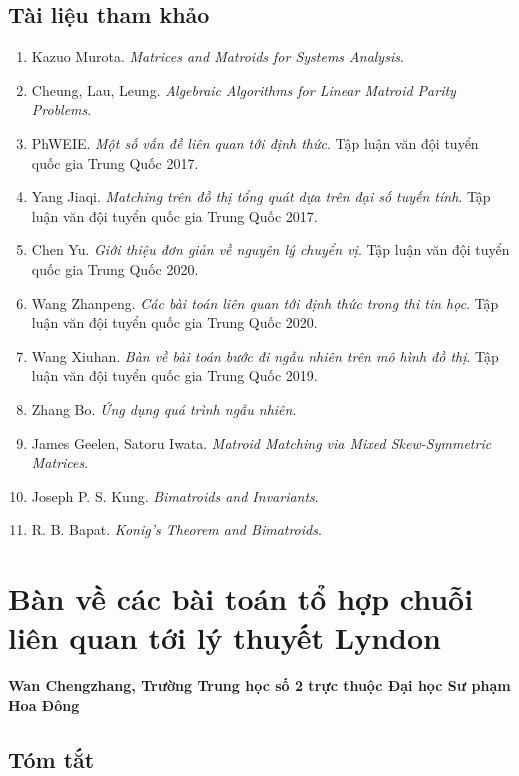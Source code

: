 \documentclass[11pt]{article}
\begin{document}
\subsection*{Tài liệu tham khảo}

\begin{enumerate}
  \item Kazuo Murota. \emph{Matrices and Matroids for Systems Analysis}.
  \item Cheung, Lau, Leung. \emph{Algebraic Algorithms for Linear Matroid
  Parity Problems}.
  \item PhWEIE. \emph{Một số vấn đề liên quan tới định thức}. Tập luận văn đội
  tuyển quốc gia Trung Quốc 2017.
  \item Yang Jiaqi. \emph{Matching trên đồ thị tổng quát dựa trên đại số tuyến
  tính}. Tập luận văn đội tuyển quốc gia Trung Quốc 2017.
  \item Chen Yu. \emph{Giới thiệu đơn giản về nguyên lý chuyển vị}. Tập luận văn
  đội tuyển quốc gia Trung Quốc 2020.
  \item Wang Zhanpeng. \emph{Các bài toán liên quan tới định thức trong thi tin
  học}. Tập luận văn đội tuyển quốc gia Trung Quốc 2020.
  \item Wang Xiuhan. \emph{Bàn về bài toán bước đi ngẫu nhiên trên mô hình đồ
  thị}. Tập luận văn đội tuyển quốc gia Trung Quốc 2019.
  \item Zhang Bo. \emph{Ứng dụng quá trình ngẫu nhiên}.
  \item James Geelen, Satoru Iwata. \emph{Matroid Matching via Mixed
  Skew-Symmetric Matrices}.
  \item Joseph P. S. Kung. \emph{Bimatroids and Invariants}.
  \item R. B. Bapat. \emph{Konig's Theorem and Bimatroids}.
\end{enumerate}

\section{Bàn về các bài toán tổ hợp chuỗi liên quan tới lý thuyết Lyndon}

\begin{center}
\textbf{Wan Chengzhang, Trường Trung học số 2 trực thuộc Đại học Sư phạm Hoa Đông}
\end{center}

\subsection*{Tóm tắt}
\end{document}
